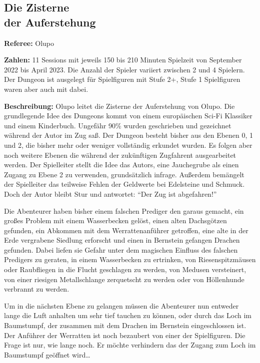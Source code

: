 \documentclass[11pt]{wbzine}
\begin{document}
\begin{multicols}{2}
\section{Die Zisterne\\ der Auferstehung}
\label{zisterne}
\textbf{Referee:} Olupo

\textbf{Zahlen:} 11 Sessions mit jeweils 150 bis 210 Minuten Spielzeit von
September 2022 bis April 2023. Die Anzahl der Spieler variiert zwischen
2 und 4 Spielern. Der Dungeon ist ausgelegt für Spielfiguren mit Stufe
2+, Stufe 1 Spielfiguren waren aber auch mit dabei.

\textbf{Beschreibung:} Olupo leitet die Zisterne der Auferstehung von
Olupo. Die grundlegende Idee des Dungeons kommt von einem europäischen
Sci-Fi Klassiker und einem Kinderbuch. Ungefähr 90\% wurden geschrieben
und gezeichnet während der Autor im Zug saß. Der Dungeon besteht bisher
aus den Ebenen 0, 1 und 2, die bisher mehr oder weniger vollständig
erkundet wurden. Es folgen aber noch weitere Ebenen die während der
zukünftigen Zugfahrent ausgearbeitet werden. Der Spielleiter stellt
die Idee das Autors, eine Jauchegrube als einen Zugang zu Ebene 2 zu
verwenden, grundsätzlich infrage. Außerdem bemängelt der Spielleiter
das teilweise Fehlen der Geldwerte bei Edelsteine und Schmuck. Doch der
Autor bleibt Stur und antwortet: ``Der Zug ist abgefahren!''

Die Abenteurer haben bisher einem falschen Prediger den garaus gemacht,
ein großes Problem mit einem Wasserbecken gelöst, einen alten
Dachsgötzen gefunden, ein Abkommen mit dem Werrattenanführer getroffen,
eine alte in der Erde vergrabene Siedlung erforscht und einen in Bernstein
gefangen Drachen gefunden. Dabei liefen sie Gefahr unter dem magischen
Einfluss des falschen Predigers zu geraten, in einem Wasserbecken
zu ertrinken, von Riesenspitzmäusen oder Raubfliegen in die Flucht
geschlagen zu werden, von Medusen versteinert, von einer riesigen
Metallschlange zerquetscht zu werden oder von Höllenhunde verbrannt
zu werden.

Um in die nächsten Ebene zu gelangen müssen die Abenteurer nun
entweder lange die Luft anhalten um sehr tief tauchen zu können, oder
durch das Loch im Baumstumpf, der zusammen mit dem Drachen im Bernstein
eingeschlossen ist. Der Anführer der Werratten ist noch bezaubert von
einer der Spielfiguren. Die Frage ist nur, wie lange noch. Er möchte
verhindern das der Zugang zum Loch im Baumstumpf geöffnet
wird\dots{}





\end{multicols}
\end{document}
